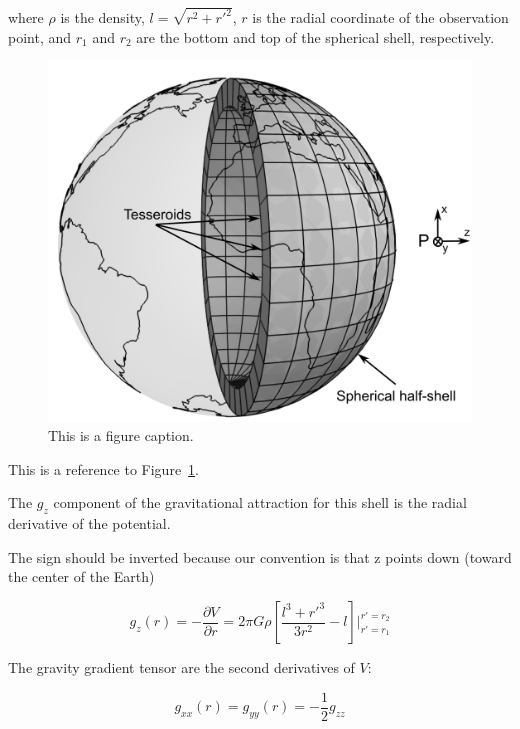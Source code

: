 \documentclass[paper,twocolumn,twoside]{geophysics}
\begin{document}
\noindent
where $\rho$ is the density,
$l = \sqrt{r^2 + {r'}^2}$,
$r$ is the radial coordinate of the observation point,
and
$r_1$ and $r_2$ are the bottom and top of the spherical shell,
respectively.

\begin{figure}
    \centering
    \includegraphics[width=\columnwidth]{figs/spherical-shell.png}
    \caption{This is a figure caption.}
    \label{fig:shell}
\end{figure}

This is a reference to Figure~\ref{fig:shell}.

The $g_z$ component of the gravitational attraction for this shell is the
radial derivative of the potential.

The sign should be inverted because our convention is that z points down
(toward the center of the Earth)

\begin{equation}
    g_z(r) = -\dfrac{\partial V}{\partial r} = 2\pi G \rho \left[ \dfrac{l^3 +
            {r'}^3}{3r^2} - l \right] \Biggr \rvert_{r'=r_1}^{r'=r_2}
    \label{eq:halfshell-gz}
\end{equation}

The gravity gradient tensor are the second derivatives of $V$:

\begin{equation}
    g_{xx}(r) = g_{yy}(r) = -\dfrac{1}{2} g_{zz}
\end{equation}
\end{document}
